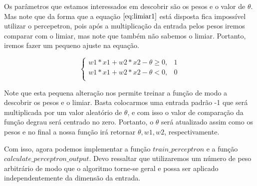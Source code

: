 \documentclass[12pt]{article}
\begin{document}
 
  \par Os parâmetros que estamos interessados em descobrir são os pesos e o valor de $\theta$. Mas note que da forma que a equação $\ref{eq:limiar1}$ está disposta fica impossível utilizar o percepetron, pois após a multiplicação da entrada pelos pesos iremos comparar com o limiar, mas note que também não sabemos o limiar. Portanto, iremos fazer um pequeno ajuste na equação. 

\begin{equation}
    \left \{
      \begin{array}{cc}
      w1*x1 + w2*x2 - \theta \geq 0 , & 1 \\
      w1*x1 + w2*x2 - \theta < 0, & 0 \\
      \end{array}
      \right.
      \label{eq:limiar2}
\end{equation}

 \par Note que esta pequena alteração nos permite treinar a função de modo a descobrir os pesos e o limiar. Basta colocarmos uma entrada padrão -1 que será multiplicada por um valor aleatório de $\theta$, e com isso o valor de comparação da função degrau será centrado no zero. Portanto, o $\theta$ será atualizado assim como os pesos e no final a nossa função irá retornar $\theta, w1, w2$, respectivamente. 
      
  \par Com isso, agora podemos implementar a função $train\_perceptron$ e a função $calculate\_perceptron\_output$. Devo ressaltar que utilizaremos um número de peso arbitrário de modo que o algoritmo torne-se geral e possa ser aplicado independentemente da dimensão da entrada.  
\end{document}
